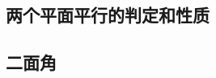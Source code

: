 \subsection{两个平面平行的判定和性质}
\begin{Practice}
  \begin{question}
    \item 
    \item 
    \item 
  \end{question}
\end{Practice}
\begin{Exercise}
  \begin{question}
    \item 
    \item 
    \item 
    \item 
    \item 
    \item 
    \item 
    \item 
    \item 
    \item 
  \end{question}
\end{Exercise}

\subsection{二面角}
\begin{Practice}
  \begin{question}
    \item 
    \item 
    \item 
    \item 
  \end{question}
\end{Practice}

